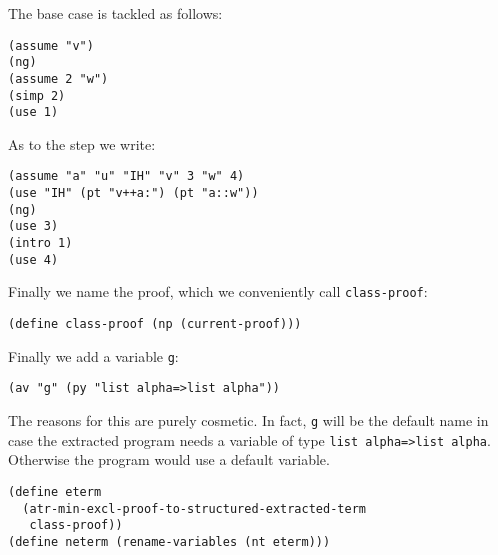 \documentclass[12pt]{amsart}
\begin{document}
The base case is tackled as follows:
\begin{verbatim}
(assume "v")
(ng)
(assume 2 "w")
(simp 2)
(use 1)
\end{verbatim}

As to the step we write:
\begin{verbatim}
(assume "a" "u" "IH" "v" 3 "w" 4)
(use "IH" (pt "v++a:") (pt "a::w"))
(ng)
(use 3)
(intro 1)
(use 4)
\end{verbatim}

Finally we name the proof, which we conveniently call \texttt{class-proof}:
\begin{verbatim}
(define class-proof (np (current-proof)))
\end{verbatim}
Finally we add a variable \texttt{g}:
\begin{verbatim}
(av "g" (py "list alpha=>list alpha"))
\end{verbatim}
The reasons for this are purely cosmetic. In fact, \texttt{g} will be
the default name in case the extracted program needs a variable of
type \texttt{list alpha=>list alpha}.  Otherwise the program would use
a default variable.
\begin{verbatim}
(define eterm
  (atr-min-excl-proof-to-structured-extracted-term
   class-proof))
(define neterm (rename-variables (nt eterm)))
\end{verbatim}


\end{document}
